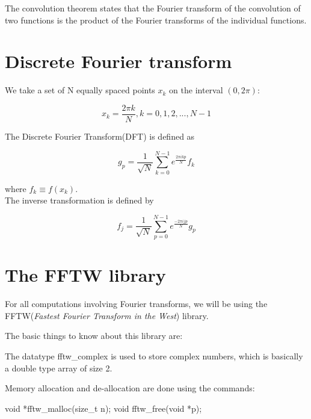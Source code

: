 \documentclass[a4,12pt,oneside]{report}
\newenvironment{sans}
	{\fontfamily{lmtt}
	 \selectfont
	 \verbatim
	 }
	 {
	 \endverbatim
	 \par
	 }
\newcommand{\textsans}{\fontfamily{lmtt}\selectfont}
\begin{document}
        The convolution theorem states that the Fourier transform of the convolution of two functions is the product of the Fourier transforms of the individual functions.
        
        \section{Discrete Fourier transform}
        
        We take a set of N equally spaced points $x_k$ on the interval $(0,2\pi)$:
        
        \begin{equation}
         x_k = \frac{2\pi k}{N}, k=0,1,2,...,N-1
        \end{equation}
        
        The Discrete Fourier Transform(DFT) is defined as
        
        \begin{equation}
         g_p = \frac{1}{\sqrt{N}}\sum_{k=0}^{N-1} e^{\frac{2\pi i kp}{N}} f_k
        \end{equation}
        
        where $f_k \equiv f(x_k)$.
        \\
        The inverse transformation is defined by
        
        \begin{equation}
         f_j = \frac{1}{\sqrt{N}}\sum_{p=0}^{N-1} e^{\frac{-2\pi i jp}{N}} g_p
        \end{equation}

        \section{The FFTW library}
        
        For all computations involving Fourier transforms, we will be using the FFTW({\em Fastest Fourier Transform in the West}) library.
        
        The basic things to know about this library are:
        
        The datatype {\textsans fftw\_complex} is used to store complex numbers, which is basically a {\textsans double} type array of size 2.
        
        Memory allocation and de-allocation are done using the commands:
        
        \begin{sans}
        	void *fftw_malloc(size_t n);
        	void fftw_free(void *p);
        \end{sans}
\end{document}
